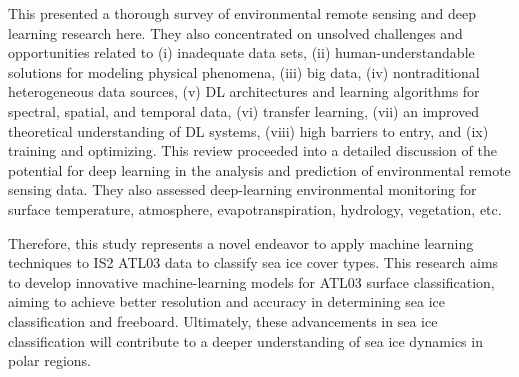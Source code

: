 This \cite{ball2017comprehensive} presented a thorough survey of environmental remote sensing and deep learning research here. They also concentrated on unsolved challenges and opportunities related to (i) inadequate data sets, (ii) human-understandable solutions for modeling physical phenomena, (iii) big data, (iv) nontraditional heterogeneous data sources, (v) DL architectures and learning algorithms for spectral, spatial, and temporal data, (vi) transfer learning, (vii) an improved theoretical understanding of DL systems, (viii) high barriers to entry, and (ix) training and optimizing.
%
This review \cite{yuan2020deep} proceeded into a detailed discussion of the potential for deep learning in the analysis and prediction of environmental remote sensing data. They also assessed deep-learning environmental monitoring for surface temperature, atmosphere, evapotranspiration, hydrology, vegetation, etc.


Therefore, this study represents a novel endeavor to apply machine learning techniques to IS2 ATL03 data to classify sea ice cover types. This research aims to develop innovative machine-learning models for ATL03 surface classification, aiming to achieve better resolution and accuracy in determining sea ice classification and freeboard. Ultimately, these advancements in sea ice classification will contribute to a deeper understanding of sea ice dynamics in polar regions.


